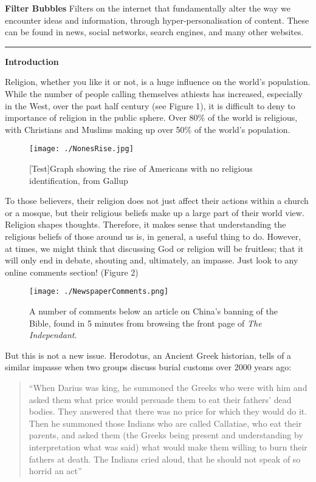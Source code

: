 \documentclass[]{article}
\begin{document}
\textbf{Filter Bubbles } Filters on the internet that fundamentally
alter the way we encounter ideas and information, through
hyper-personalisation of content. These can be found in news, social
networks, search engines, and many other websites.

\begin{center}\rule{0.5\linewidth}{\linethickness}\end{center}

\textbf{Introduction}

Religion, whether you like it or not, is a huge influence on the world's
population. While the number of people calling themselves athiests has
increased, especially in the West, over the past half century (see
Figure 1), it is difficult to deny to importance of religion in the
public sphere. Over 80\% of the world is religious, with Christians and
Muslims making up over 50\% of the world's
population\autocite{HackettChristiansremainworld2017}.

\begin{figure}
\centering
\texttt{[image: ./NonesRise.jpg]}
\caption{{[}Test{]}Graph showing the rise of Americans with no religious
identification, from Gallup\autocite{GallupThisEasterSmaller}}
\end{figure}

To those believers, their religion does not just affect their actions
within a church or a mosque, but their religious beliefs make up a large
part of their world view. Religion shapes thoughts. Therefore, it makes
sense that understanding the religious beliefs of those around us is, in
general, a useful thing to do. However, at times, we might think that
discussing God or religion will be fruitless; that it will only end in
debate, shouting and, ultimately, an impasse. Just look to any online
comments section! (Figure 2)

\begin{figure}
\centering
\texttt{[image: ./NewspaperComments.png]}
\caption{A number of comments below an article on China's banning of the
Bible, found in 5 minutes from browsing the front page of \emph{The
Independant}.\autocite{OppenheimChinacrackssales2018}}
\end{figure}

But this is not a new issue. Herodotus, an Ancient Greek historian,
tells of a similar impasse when two groups discuss burial customs over
2000 years ago:

\begin{quote}
``When Darius was king, he summoned the Greeks who were with him and
asked them what price would persuade them to eat their fathers' dead
bodies. They answered that there was no price for which they would do
it. Then he summoned those Indians who are called Callatiae, who eat
their parents, and asked them (the Greeks being present and
understanding by interpretation what was said) what would make them
willing to burn their fathers at death. The Indians cried aloud, that he
should not speak of so horrid an
act''\autocite{HerodotusHistoryHerodotus1910}
\end{quote}
\end{document}

